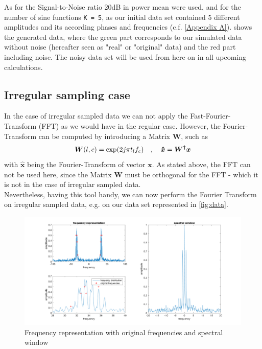 As for the Signal-to-Noise ratio 20dB in power mean were used, and for the number of sine functions \texttt{K = 5}, as our initial data set contained 5 different amplitudes and its according phases and frequencies (c.f. \cref{Appendix A}).
 shows the generated data, where the green part corresponds to our simulated data without noise (hereafter seen as "real" or "original" data) and the red part including noise. The noisy data set will be used from here on in all upcoming calculations.



\subsection{Irregular sampling case}
In the case of irregular sampled data we can not apply the Fast-Fourier-Transform (FFT) as we would have in the regular case. However, the Fourier-Transform can be computed by introducing a Matrix $\boldsymbol{W}$, such as
\begin{equation}
	\centering
	\boldsymbol{W}(l,c) = \exp(2j\pi t_l f_c) \quad ,\quad \boldsymbol{\hat{x}} = \boldsymbol{W^\dagger}\boldsymbol{x}
\end{equation}
with $\boldsymbol{\hat{x}}$ being the Fourier-Transform of vector $\boldsymbol{x}$. As stated above, the FFT can not be used here, since the Matrix $\boldsymbol{W}$ must be orthogonal for the FFT - which it is not in the case of irregular sampled data.\\
Nevertheless, having this tool handy, we can now perform the Fourier Transform on irregular sampled data, e.g. on our data set represented in \cref{fig:data}.

\begin{figure}[h!]
	\centering
	\includegraphics[width=\textwidth]{images/data_freq}
	\caption{Frequency representation with original frequencies and spectral window}
	\label{fig:data_freq}
\end{figure}

